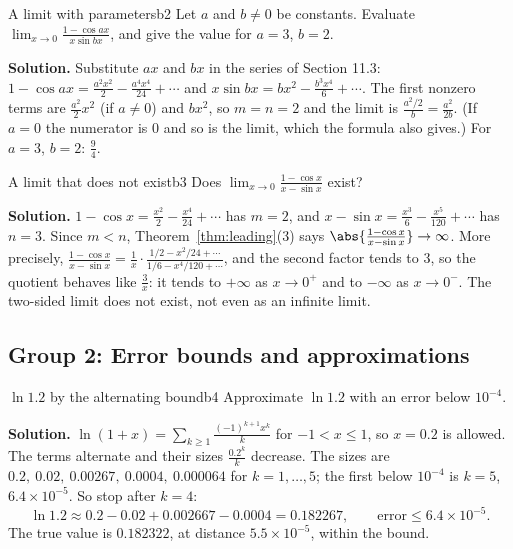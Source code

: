 \documentclass[11pt]{article}
\begin{document}
\begin{exmp}{A limit with parameters}{b2}
Let $a$ and $b\ne0$ be constants. Evaluate $\displaystyle\lim_{x\to0}\frac{1-\cos ax}{x\sin bx}$, and give the value for $a=3$, $b=2$.

\textbf{Solution.} Substitute $ax$ and $bx$ in the series of Section 11.3: $1-\cos ax=\frac{a^2x^2}2-\frac{a^4x^4}{24}+\cdots$ and $x\sin bx=bx^2-\frac{b^3x^4}6+\cdots$. The first nonzero terms are $\frac{a^2}2x^2$ (if $a\ne0$) and $bx^2$, so $m=n=2$ and the limit is $\frac{a^2/2}b=\frac{a^2}{2b}$. (If $a=0$ the numerator is $0$ and so is the limit, which the formula also gives.) For $a=3$, $b=2$: $\frac94$.
\end{exmp}

\begin{exmp}{A limit that does not exist}{b3}
Does $\displaystyle\lim_{x\to0}\frac{1-\cos x}{x-\sin x}$ exist?

\textbf{Solution.} $1-\cos x=\frac{x^2}2-\frac{x^4}{24}+\cdots$ has $m=2$, and $x-\sin x=\frac{x^3}6-\frac{x^5}{120}+\cdots$ has $n=3$. Since $m<n$, Theorem~\ref{thm:leading}(3) says $\abs{\frac{1-\cos x}{x-\sin x}}\to\infty$. More precisely, $\frac{1-\cos x}{x-\sin x}=\frac1x\cdot\frac{1/2-x^2/24+\cdots}{1/6-x^4/120+\cdots}$, and the second factor tends to $3$, so the quotient behaves like $\frac3x$: it tends to $+\infty$ as $x\to0^+$ and to $-\infty$ as $x\to0^-$. The two-sided limit does not exist, not even as an infinite limit.
\end{exmp}

\subsection*{Group 2: Error bounds and approximations}

\begin{exmp}{$\ln1.2$ by the alternating bound}{b4}
Approximate $\ln1.2$ with an error below $10^{-4}$.

\textbf{Solution.} $\ln(1+x)=\sum_{k\ge1}\frac{(-1)^{k+1}x^k}k$ for $-1<x\le1$, so $x=0.2$ is allowed. The terms alternate and their sizes $\frac{0.2^k}k$ decrease. The sizes are $0.2,\ 0.02,\ 0.00267,\ 0.0004,\ 0.000064$ for $k=1,\dots,5$; the first below $10^{-4}$ is $k=5$, $6.4\times10^{-5}$. So stop after $k=4$:
\[
\ln1.2\approx0.2-0.02+0.002667-0.0004=0.182267,\qquad\text{error}\le6.4\times10^{-5}.
\]
The true value is $0.182322$, at distance $5.5\times10^{-5}$, within the bound.
\end{exmp}
\end{document}

